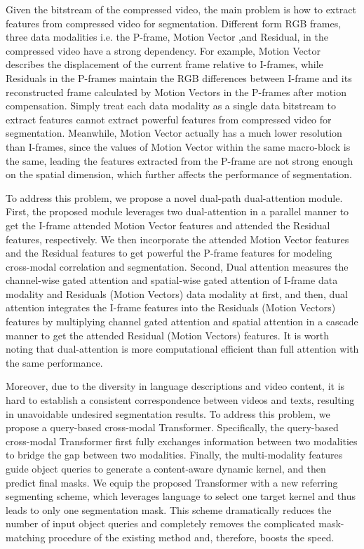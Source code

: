 \documentclass[sigconf]{acmart}
\begin{document}
Given the bitstream of the compressed video, the main problem is how to extract features from compressed video for segmentation. Different form RGB frames, three data modalities i.e. the P-frame, Motion Vector ,and Residual, in the compressed video have a strong dependency. For example, Motion Vector describes the displacement of the current frame relative to I-frames, while Residuals in the P-frames maintain the RGB differences between I-frame and its reconstructed frame calculated by Motion Vectors in the P-frames after motion compensation. Simply treat each data modality as a single data bitstream to extract features cannot extract powerful features from compressed video for segmentation. Meanwhile, Motion Vector actually has a much lower resolution than I-frames, since the values of Motion Vector within the same macro-block is the same, leading the features extracted from the P-frame are not strong enough on the spatial dimension, which further affects the performance of segmentation.








To address this problem, we propose a novel dual-path dual-attention module. 
First, the proposed module leverages two dual-attention in a parallel manner to get the I-frame attended Motion Vector features and attended the Residual features, respectively. We then incorporate the attended Motion Vector features and the Residual features to get powerful the P-frame features for modeling cross-modal correlation and segmentation.
Second, Dual attention measures the channel-wise gated attention and spatial-wise gated attention of I-frame data modality and Residuals (Motion Vectors) data modality at first, and then, dual attention integrates the I-frame features into the Residuals (Motion Vectors) features by multiplying channel gated attention and spatial attention in a cascade manner to get the attended Residual (Motion Vectors) features.  It is worth noting that dual-attention is more computational efficient than full attention with the same performance.


Moreover, due to the diversity in language descriptions and video content, it is hard to establish a consistent correspondence between videos and texts, resulting in unavoidable undesired segmentation results.
To address this problem, we propose a query-based cross-modal Transformer. Specifically, the query-based cross-modal Transformer first fully exchanges information between two modalities to bridge the gap between two modalities.
Finally, the multi-modality features guide object queries to generate a content-aware dynamic kernel, and then predict final masks. We equip the proposed Transformer with a new referring segmenting scheme, which leverages language to select one target kernel and thus leads to only one segmentation mask. This scheme dramatically reduces the number of input object queries and completely removes the complicated mask-matching procedure of the existing method and, therefore, boosts the speed.
\end{document}
